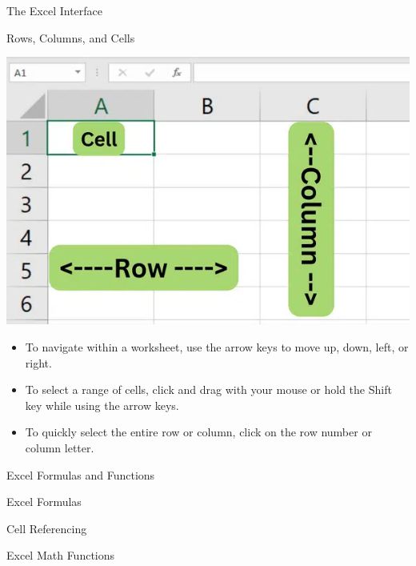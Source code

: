 \documentclass[
  10pt,
  ignorenonframetext,
]{beamer}
\begin{document}
\begin{frame}{The Excel Interface}
\protect\hypertarget{the-excel-interface-3}{}
\begin{block}{Rows, Columns, and Cells}
\protect\hypertarget{rows-columns-and-cells-1}{}
\begin{center}\includegraphics[width=0.5\linewidth]{pictures/Excel-cells} \end{center}

\begin{itemize}
\item
  To navigate within a worksheet, use the arrow keys to move up, down,
  left, or right.
\item
  To select a range of cells, click and drag with your mouse or hold the
  Shift key while using the arrow keys.
\item
  To quickly select the entire row or column, click on the row number or
  column letter.
\end{itemize}
\end{block}
\end{frame}

\begin{frame}{Excel Formulas and Functions}
\protect\hypertarget{excel-formulas-and-functions}{}
\begin{block}{Excel Formulas}
\protect\hypertarget{excel-formulas}{}
\end{block}

\begin{block}{Cell Referencing}
\protect\hypertarget{cell-referencing}{}
\end{block}

\begin{block}{Excel Math Functions}
\protect\hypertarget{excel-math-functions}{}
\end{block}
\end{frame}
\end{document}
